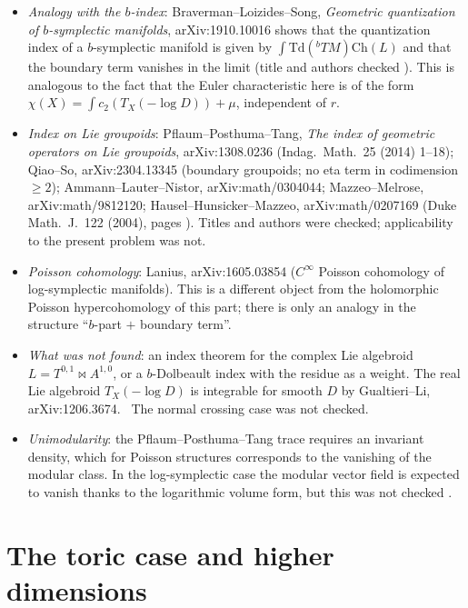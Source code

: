 \begin{rem}
\begin{itemize}
\item \emph{Analogy with the $b$-index}: Braverman--Loizides--Song, \emph{Geometric quantization of $b$-symplectic manifolds}, arXiv:1910.10016 shows that the quantization index of a $b$-symplectic manifold is given by $\int\mathrm{Td}({}^bTM)\mathrm{Ch}(L)$ and that the boundary term vanishes in the limit (title and authors checked \tC). This is analogous to the fact that the Euler characteristic here is of the form $\chi(X)=\int c_2(T_X(-\log D))+\mu$, independent of $r$.
\item \emph{Index on Lie groupoids}: Pflaum--Posthuma--Tang, \emph{The index of geometric operators on Lie groupoids}, arXiv:1308.0236 (Indag.\ Math.\ 25 (2014) 1--18); Qiao--So, arXiv:2304.13345 (boundary groupoids; no eta term in codimension $\ge2$); Ammann--Lauter--Nistor, arXiv:math/0304044; Mazzeo--Melrose, arXiv:math/9812120; Hausel--Hunsicker--Mazzeo, arXiv:math/0207169 (Duke Math.\ J.\ 122 (2004), pages \tQ). Titles and authors were checked; applicability to the present problem was not.
\item \emph{Poisson cohomology}: Lanius, arXiv:1605.03854 ($C^\infty$ Poisson cohomology of log-symplectic manifolds). This is a different object from the holomorphic Poisson hypercohomology of this part; there is only an analogy in the structure ``$b$-part $+$ boundary term''.
\item \emph{What was not found}: an index theorem for the complex Lie algebroid $L=T^{0,1}\bowtie A^{1,0}$, or a $b$-Dolbeault index with the residue as a weight. The real Lie algebroid $T_X(-\log D)$ is integrable for smooth $D$ by Gualtieri--Li, arXiv:1206.3674. \tC\ The normal crossing case was not checked.
\item \emph{Unimodularity}: the Pflaum--Posthuma--Tang trace requires an invariant density, which for Poisson structures corresponds to the vanishing of the modular class. In the log-symplectic case the modular vector field is expected to vanish thanks to the logarithmic volume form, but this was not checked \tQ.
\end{itemize}
\end{rem}

\section{The toric case and higher dimensions}\label{p1:sec:toric}
